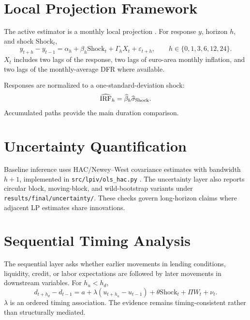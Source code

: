 \section{Local Projection Framework}

The active estimator is a monthly local projection \parencite{Jorda2005}. For response \(y\), horizon \(h\), and shock \(\mathrm{Shock}_{t}\),
\begin{equation}
  y_{t+h} - y_{t-1}
  =
  \alpha_h
  + \beta_h \mathrm{Shock}_{t}
  + \Gamma_h X_t
  + \varepsilon_{t+h},
  \qquad
  h \in \{0,1,3,6,12,24\}.
  \label{eq:baseline-lp}
\end{equation}
\(X_t\) includes two lags of the response, two lags of euro-area monthly inflation, and two lags of the monthly-average DFR where available.

Responses are normalized to a one-standard-deviation shock:
\begin{equation}
  \widehat{\operatorname{IRF}}_{h}
  =
  \widehat{\beta}_{h}\widehat{\sigma}_{\mathrm{Shock}}.
  \label{eq:lp-normalization}
\end{equation}
Accumulated paths provide the main duration comparison.

\section{Uncertainty Quantification}

Baseline inference uses HAC/Newey--West covariance estimates with bandwidth \(h+1\), implemented in \nolinkurl{src/lpiv/ols_hac.py} \parencite{NeweyWest1987}. The uncertainty layer also reports circular block, moving-block, and wild-bootstrap variants under \nolinkurl{results/final/uncertainty/}. These checks govern long-horizon claims where adjacent LP estimates share innovations.

\section{Sequential Timing Analysis}

The sequential layer asks whether earlier movements in lending conditions, liquidity, credit, or labor expectations are followed by later movements in downstream variables. For \(h_u<h_d\),
\begin{equation}
  d_{t+h_d} - d_{t-1}
  =
  a
  + \lambda (u_{t+h_u} - u_{t-1})
  + \theta \mathrm{Shock}_{t}
  + \Pi W_t
  + \nu_t .
  \label{eq:sequential-timing}
\end{equation}
\(\lambda\) is an ordered timing association. The evidence remains timing-consistent rather than structurally mediated.

